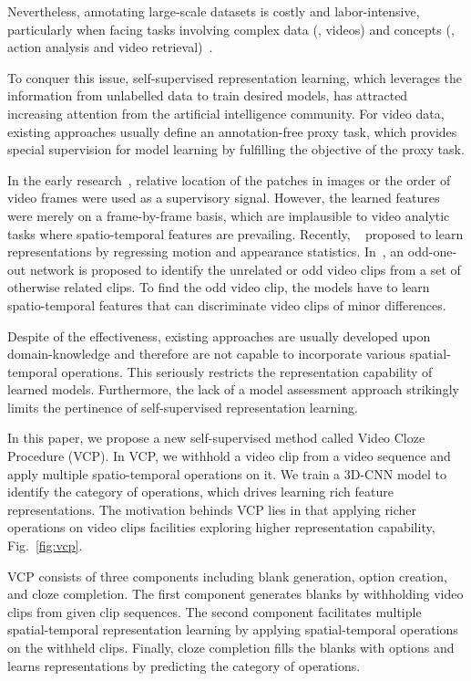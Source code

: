 \documentclass[letterpaper]{article}
\begin{document}
Nevertheless, annotating large-scale datasets is costly and labor-intensive, particularly when facing tasks involving complex data (, videos) and concepts (, action analysis and video retrieval)~\cite{fernando2017self,kay2017kinetics}. 


To conquer this issue, self-supervised representation learning, which leverages the information from unlabelled data to train desired models, has attracted increasing attention from the artificial intelligence community.  
For video data, existing approaches usually define an annotation-free proxy task, which provides special supervision for model learning by fulfilling the objective of the proxy task. 

In the early research~\cite{doersch2015unsupervised,WangXiaoLong2015}, relative location of the patches in images or the order of video frames were used as a supervisory signal. However, the learned features were merely on a frame-by-frame basis, which are implausible to video analytic tasks where spatio-temporal features are prevailing. Recently, ~\cite{wang2019self} proposed to learn representations by regressing motion and appearance statistics. In~\cite{fernando2017self}, 
an odd-one-out network is proposed to identify the unrelated or odd video clips from a set of otherwise related clips. To find the odd video clip, the models have to learn spatio-temporal features that can discriminate video clips of minor differences.

Despite of the effectiveness, existing approaches are usually developed upon domain-knowledge and therefore are not capable to incorporate various spatial-temporal operations. This seriously restricts the representation capability of learned models. Furthermore, the lack of a model assessment approach strikingly limits the pertinence of self-supervised representation learning.




In this paper, we propose a new self-supervised method called Video Cloze Procedure (VCP). In VCP, we withhold a video clip from a video sequence and apply multiple spatio-temporal operations on it. We train a 3D-CNN model to identify the category of operations, which drives learning rich feature representations. The motivation behinds VCP lies in that applying richer operations on video clips facilities exploring higher representation capability, Fig.\ \ref{fig:vcp}. 


VCP consists of three components including blank generation, option creation, and cloze completion. The first component generates blanks by withholding video clips from given clip sequences. The second component facilitates multiple spatial-temporal representation learning by applying spatial-temporal operations on the withheld clips. Finally, cloze completion fills the blanks with options and learns representations by predicting the category of operations. 
\end{document}
